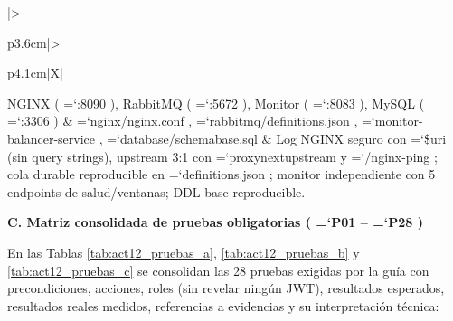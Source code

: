 \documentclass[11pt,a4paper]{article}
\renewcommand{\_}{\oldunderscore\allowbreak}
\DeclareRobustCommand{\texttt}[1]{%
  {\upshape\ttfamily\fontsize{9}{10.8}\selectfont\hyphenchar\font=`\-\relax #1}%
}
\begin{document}
{\begin{xltabular}{\textwidth}{|>{\raggedright\arraybackslash\hspace{0pt}}p{3.6cm}|>{\raggedright\arraybackslash\hspace{0pt}}p{4.1cm}|X|}
\hline
NGINX (\texttt{:8090}), RabbitMQ (\texttt{:5672}), Monitor (\texttt{:8083}), MySQL (\texttt{:3306}) & \texttt{nginx/\allowbreak{}nginx.\allowbreak{}conf}, \texttt{rabbitmq/\allowbreak{}definitions.\allowbreak{}json}, \texttt{monitor-balancer-service}, \texttt{database/\allowbreak{}schema\_base.\allowbreak{}sql} & Log NGINX seguro con \texttt{\$uri} (sin query strings), upstream 3:1 con \texttt{proxy\_next\_upstream} y \texttt{/nginx-ping}; cola durable reproducible en \texttt{definitions.\allowbreak{}json}; monitor independiente con 5 endpoints de salud/ventanas; DDL base reproducible. \\
\end{xltabular}}

\vspace{0.2cm}
\noindent\textbf{C. Matriz consolidada de pruebas obligatorias (\texttt{P01}--\texttt{P28})}

\noindent En las Tablas \ref{tab:act12_pruebas_a}, \ref{tab:act12_pruebas_b} y \ref{tab:act12_pruebas_c} se consolidan las 28 pruebas exigidas por la guía con precondiciones, acciones, roles (sin revelar ningún JWT), resultados esperados, resultados reales medidos, referencias a evidencias y su interpretación técnica:
\end{document}
